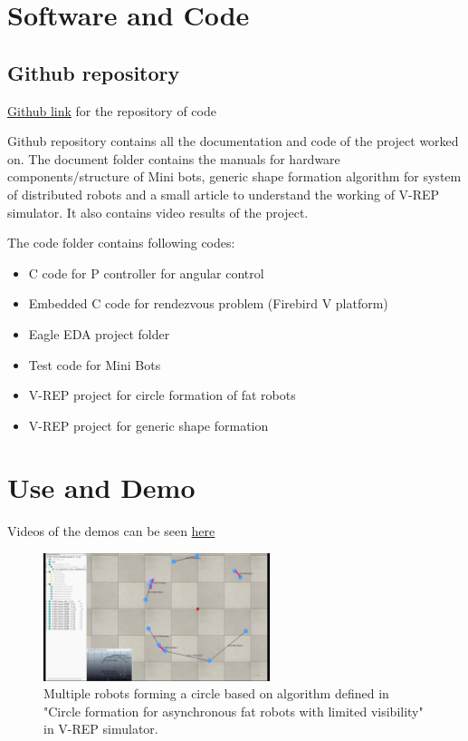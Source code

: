 \documentclass[a4paper,12pt,oneside]{book}
\begin{document}
\chapter{Software and Code}
\section{Github repository}
\href{https://github.com/eYSIP-2017/eYSIP-2017_DistributedRobotics.git}{Github link} for the repository of code

Github repository contains all the documentation and code of the project worked on. The document folder contains the manuals for hardware components/structure of Mini bots, generic shape formation algorithm for system of distributed robots and a small article to understand the working of V-REP simulator. It also contains video results of the project.

The code folder contains following codes:
\begin{itemize}
	\item C code for P controller for angular control
	\item Embedded C code for rendezvous problem (Firebird V platform)
	\item Eagle EDA project folder
	\item Test code for Mini Bots
	\item V-REP project for circle formation of fat robots
	\item V-REP project for generic shape formation
\end{itemize}

\chapter{Use and Demo}

Videos of the demos can be seen \href{https://github.com/eYSIP-2017/eYSIP-2017_DistributedRobotics/tree/master/Documents/Videos}{here}
\begin{figure}[h!]
	\centering\includegraphics[width=250px]{./Pictures/Circle_formation_2}		
	\caption{Multiple robots forming a circle based on algorithm defined in "Circle formation for asynchronous fat robots with limited visibility" in V-REP simulator.}
\end{figure}
\end{document}
